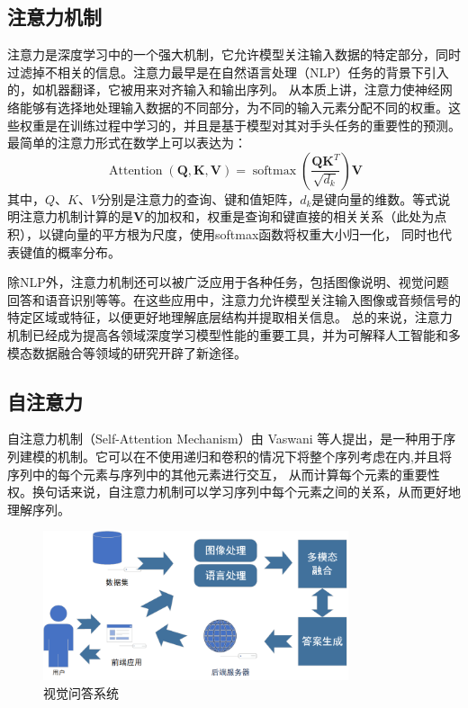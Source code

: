 \subsection{注意力机制}
注意力是深度学习中的一个强大机制，它允许模型关注输入数据的特定部分，同时过滤掉不相关的信息。注意力最早是在自然语言处理（NLP）任务的背景下引入的，如机器翻译，它被用来对齐输入和输出序列。
从本质上讲，注意力使神经网络能够有选择地处理输入数据的不同部分，为不同的输入元素分配不同的权重。这些权重是在训练过程中学习的，并且是基于模型对其对手头任务的重要性的预测。
最简单的注意力形式在数学上可以表达为：
$$
\operatorname{Attention}(\mathbf{Q}, \mathbf{K}, \mathbf{V})=\operatorname{softmax}\left(\frac{\mathbf{Q K}^T}{\sqrt{d_k}}\right) \mathbf{V}
$$
其中，$Q、K、V$分别是注意力的查询、键和值矩阵，$d_k$是键向量的维数。等式说明注意力机制计算的是$\mathbf{V}$的加权和，权重是查询和键直接的相关关系（此处为点积），以键向量的平方根为尺度，使用softmax函数将权重大小归一化，
同时也代表键值的概率分布。

除NLP外，注意力机制还可以被广泛应用于各种任务，包括图像说明、视觉问题回答和语音识别等等。在这些应用中，注意力允许模型关注输入图像或音频信号的特定区域或特征，以便更好地理解底层结构并提取相关信息。
总的来说，注意力机制已经成为提高各领域深度学习模型性能的重要工具，并为可解释人工智能和多模态数据融合等领域的研究开辟了新途径。

\subsection{自注意力}
自注意力机制（Self-Attention Mechanism）由 Vaswani 等人\cite{vaswani2017attention}提出，是一种用于序列建模的机制。它可以在不使用递归和卷积的情况下将整个序列考虑在内,并且将序列中的每个元素与序列中的其他元素进行交互，
从而计算每个元素的重要性权。换句话来说，自注意力机制可以学习序列中每个元素之间的关系，从而更好地理解序列。
\begin{figure}[htbp]
	\centering	
	\includegraphics[width=0.8\textwidth]{Fig/myfig/chapter2/sys_vqa.png}  %
	\caption{\label{sys_need}视觉问答系统} 
\end{figure}

